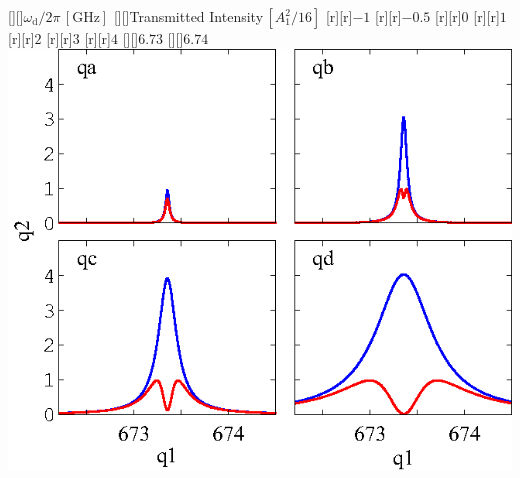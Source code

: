 

 \figstyle
 [][]{$\omega_\text{d}/2\pi\,[\text{GHz}]$}
 [][]{Transmitted Intensity\,$[A_1^2/16]$}
 [r][r]{\figsmall$-1$}
 [r][r]{\figsmall$-0.5$}
 [r][r]{\figsmall$0$}
 [r][r]{\figsmall$1$}
 [r][r]{\figsmall$2$}
 [r][r]{\figsmall$3$}
 [r][r]{\figsmall$4$}
 [][]{\figsmall$6.73$}
 [][]{\figsmall$6.74$}
 \includegraphics[height=\bigheight]{hetvsphtcnt.eps}

